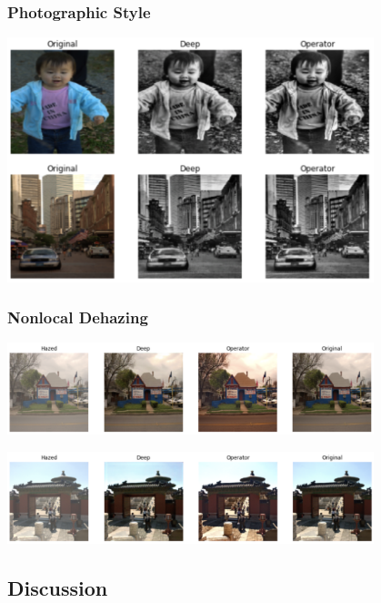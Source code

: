 \documentclass{article}
\begin{document}
\subsubsection*{Photographic Style}

\begin{center}
\includegraphics[width=0.8\textwidth]{img/3.png}
\end{center}

\subsubsection*{Nonlocal Dehazing}

\begin{center}
\includegraphics[width=0.8\textwidth]{img/4.png}
\end{center}

\begin{center}
\includegraphics[width=0.8\textwidth]{img/5.png}
\end{center}

\subsection*{Discussion}
\end{document}

